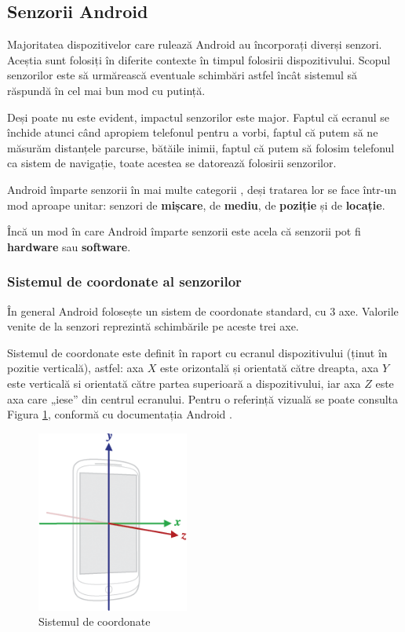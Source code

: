 \documentclass[12pt, a4paper, oneside]{article}
\begin{document}
\newpage
\subsection{Senzorii Android}
Majoritatea dispozitivelor care rulează Android au încorporați diverși senzori. Aceștia sunt folosiți în diferite contexte în timpul folosirii dispozitivului. Scopul senzorilor este să urmărească eventuale schimbări astfel încât sistemul să răspundă în cel mai bun mod cu putință.

	Deși poate nu este evident, impactul senzorilor este major. Faptul că ecranul se închide atunci când apropiem telefonul pentru a vorbi, faptul că putem să ne măsurăm distanțele parcurse, bătăile inimii, faptul că putem să folosim telefonul ca sistem de navigație, toate acestea se datorează folosirii senzorilor.
	
	Android împarte senzorii în mai multe categorii \cite{DeveloperAndroid}, deși tratarea lor se face într-un mod aproape unitar: senzori de \textbf{mișcare}, de \textbf{mediu}, de \textbf{poziție} și de \textbf{locație}.

	Încă un mod în care Android împarte senzorii este acela că senzorii pot fi \textbf{hardware} sau \textbf{software}.\\
	
\subsubsection{Sistemul de coordonate al senzorilor}
În general Android folosește un sistem de coordonate standard, cu 3 axe. Valorile venite de la senzori reprezintă schimbările pe aceste trei axe.

Sistemul de coordonate este definit în raport cu ecranul dispozitivului (ținut în pozitie verticală), astfel: axa $X$ este orizontală și orientată către dreapta, axa $Y$ este verticală si orientată către partea superioară a dispozitivului, iar axa $Z$ este axa care „iese” din centrul ecranului. Pentru o referință vizuală se poate consulta Figura \ref{fig:axis_device}, conformă cu documentația Android \cite{DeveloperAndroid}.

\begin{figure}[hbtp]
\centering
\includegraphics[width=5cm]{figures/axis_device.png}
\caption{Sistemul de coordonate}
\label{fig:axis_device}
\end{figure}
\end{document}
